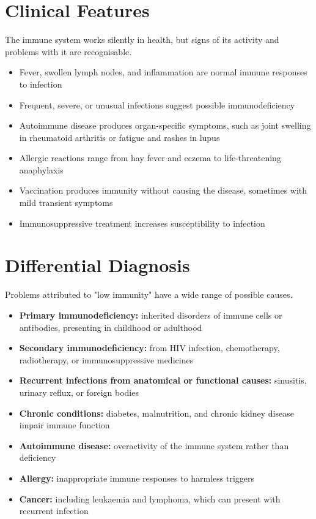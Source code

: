 \section*{Clinical Features}
The immune system works silently in health, but signs of its activity and problems with it are recognisable.
\begin{itemize}
    \item Fever, swollen lymph nodes, and inflammation are normal immune responses to infection
    \item Frequent, severe, or unusual infections suggest possible immunodeficiency
    \item Autoimmune disease produces organ-specific symptoms, such as joint swelling in rheumatoid arthritis or fatigue and rashes in lupus
    \item Allergic reactions range from hay fever and eczema to life-threatening anaphylaxis
    \item Vaccination produces immunity without causing the disease, sometimes with mild transient symptoms
    \item Immunosuppressive treatment increases susceptibility to infection
\end{itemize}

\section*{Differential Diagnosis}
Problems attributed to "low immunity" have a wide range of possible causes.
\begin{itemize}
    \item \textbf{Primary immunodeficiency:} inherited disorders of immune cells or antibodies, presenting in childhood or adulthood
    \item \textbf{Secondary immunodeficiency:} from HIV infection, chemotherapy, radiotherapy, or immunosuppressive medicines
    \item \textbf{Recurrent infections from anatomical or functional causes:} sinusitis, urinary reflux, or foreign bodies
    \item \textbf{Chronic conditions:} diabetes, malnutrition, and chronic kidney disease impair immune function
    \item \textbf{Autoimmune disease:} overactivity of the immune system rather than deficiency
    \item \textbf{Allergy:} inappropriate immune responses to harmless triggers
    \item \textbf{Cancer:} including leukaemia and lymphoma, which can present with recurrent infection
\end{itemize}

